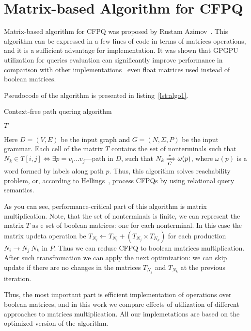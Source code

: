 \section{Matrix-based Algorithm for CFPQ}

Matrix-based algorithm for CFPQ was proposed by Rustam Azimov~\cite{Azimov:2018:CPQ:3210259.3210264}.
This algorithm can be expressed in a few lines of code in terms of matrices operations, and it is a sufficient advantage for implementation.
It was shown that GPGPU utilization for queries evaluation can significantly improve performance in comparison with other implementations~\cite{Azimov:2018:CPQ:3210259.3210264} even float matrices used instead of boolean matrices.

Pseudocode of the algorithm is presented in listing~\ref{lst:algo1}.

\begin{algorithm}
\begin{algorithmic}[1]
\caption{Context-free path quering algorithm}
\label{lst:algo1}

    \EndFor

    \EndWhile
\State \Return $T$
\EndFunction
\end{algorithmic}
\end{algorithm}

Here $D = (V, E)$ be the input graph and $G = (N,\Sigma,P)$ be the input grammar.
Each cell of the matrix $T$ contains the set of nonterminals such that $N_k \in T[i,j] \iff \exists p = v_i \ldots v_j $---path in $D$, such that $N_k \xRightarrow[G]{*} \omega(p) $, where $\omega(p)$ is a word formed by labels along path $p$.
Thus, this algorithm solves reachability problem, or, according to Hellings~\cite{hellingsRelational}, process CFPQs by using relational query semantics.

As you can see, performance-critical part of this algorithm is matrix multiplication.
Note, that the set of nonterminals is finite, we can represent the matrix $T$ as e set of boolean matrices: one for each nonterminal.
In this case the matrix updeta operation be $T_{N_i} \leftarrow T_{N_i} + (T_{N_j} \times T_{N_k})$ for each production $N_i \rightarrow N_j \ N_k$ in $P$.
Thus we can reduse CFPQ to boolean matrices multiplication.
After such transfromation we can apply the next optimization: we can skip update if there are no changes in the matrices $T_{N_j}$ and $T_{N_k}$ at the previous iteration.

Thus, the most important part is efficient implementation of operations over boolean matrices, and in this work we compare effects of utilization of different approaches to matrices multiplication.
All our implemetations are based on the optimized version of the algorithm.
